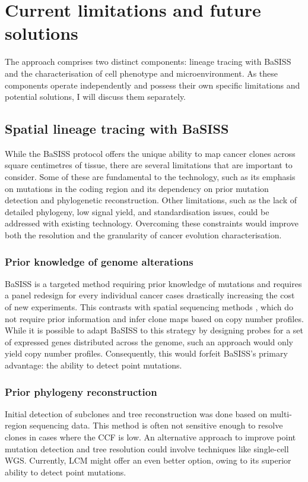 \section{Current limitations and future solutions}

The approach comprises two distinct components: lineage tracing with \ac{BaSISS} and the characterisation of cell phenotype and microenvironment. As these components operate independently and possess their own specific limitations and potential solutions, I will discuss them separately.

\subsection{Spatial lineage tracing with \acs{BaSISS}}

While the \ac{BaSISS} protocol offers the unique ability to map cancer clones across square centimetres of tissue, there are several limitations that are important to consider. Some of these are fundamental to the technology, such as its emphasis on mutations in the coding region and its dependency on prior mutation detection and phylogenetic reconstruction. Other limitations, such as the lack of detailed phylogeny, low signal yield, and standardisation issues, could be addressed with existing technology. Overcoming these constraints would improve both the resolution and the granularity of cancer evolution characterisation. 

\subsubsection*{Prior knowledge of genome alterations}

\ac{BaSISS} is a targeted method requiring prior knowledge of mutations and requires a panel redesign for every individual cancer cases drastically increasing the cost of new experiments. This contrasts with spatial sequencing methods \parencite{Zhao2022-xd,Erickson2022-zh}, which do not require prior information and infer clone maps based on copy number profiles. While it is possible to adapt \ac{BaSISS} to this strategy by designing probes for a set of expressed genes distributed across the genome, such an approach would only yield copy number profiles. Consequently, this would forfeit \ac{BaSISS}'s primary advantage: the ability to detect point mutations.

\subsubsection*{Prior phylogeny reconstruction}
Initial detection of subclones and tree reconstruction was done based on multi-region sequencing data. This method is often not sensitive enough to resolve clones in cases where the \ac{CCF} is low. An alternative approach to improve point mutation detection and tree resolution could involve techniques like single-cell \ac{WGS}. Currently, \ac{LCM} might offer an even better option, owing to its superior ability to detect point mutations.

